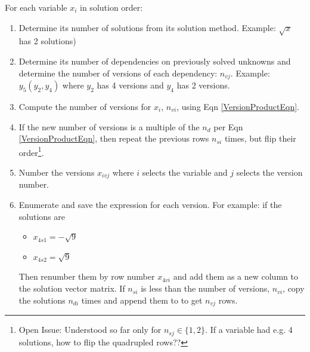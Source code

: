 \documentclass[letterpaper]{article}
\begin{document}
\noindent
For each variable $x_i$ in solution order:
\begin{enumerate}
  \item Determine its number of solutions from its solution method. Example: $\sqrt{x}$ has 2 solutions)
  \item Determine its number of dependencies on previously solved unknowns and determine
  the number of versions of each dependency: $n_{vj}$.  Example: $y_5(y_2, y_4)$ where
  $y_2$ has 4 versions and $y_4$ has 2 versions.
  \item Compute the number of versions for $x_i$, $n_{vi}$,  using Eqn \ref{VersionProductEqn}.
  \item If the new number of versions is a multiple of the $n_d$ per  Eqn \ref{VersionProductEqn}, then
  repeat the previous rows  $n_{si}$ times, but flip their order\footnote{Open Issue:
  Understood so far only for $n_{sj} \in \{ 1,2\}$.
  If a variable had e.g. 4 solutions, how to flip the quadrupled rows??}.
  \item Number the versions $x_{ivj}$ where $i$ selects the variable and $j$ selects the
  version number.
  \item Enumerate and save the expression for each  version.  For example: if the solutions are
     \begin{itemize}
        \item $x_{4s1} = -\sqrt{9}$
        \item $x_{4s2} =  \sqrt{9}$
     \end{itemize}
     Then renumber them by row number $x_{4vi}$ and add them as a new column to the solution vector matrix.
  If $n_{si}$ is less than the number of versions, $n_{vi}$,
  copy the solutions $n_{di}$ times and append them to to get $n_{vj}$ rows.
\end{enumerate}

%
%



%
\end{document}
